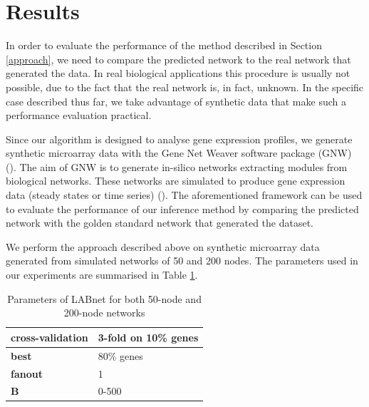\section{Results} \label{results} 
In order to evaluate the performance of the method described in Section \ref{approach}, we need to compare the predicted network to the real network that generated the data. In real biological applications this procedure is usually not possible, due to the fact that the real network is, in fact, unknown. 
In the specific case described thus far, we take advantage of synthetic data that make such a performance evaluation practical. 

Since our algorithm is designed to analyse gene expression profiles, we generate synthetic microarray data with the Gene Net Weaver software package (GNW) (\citealp{gnw1}). The aim of GNW is to generate in-silico networks extracting modules from biological networks. These networks are simulated to produce gene expression data (steady states or time series) (\citealp{gnw2}). The aforementioned framework can be used to evaluate the performance of our inference method by comparing the predicted network with the golden standard network that generated the dataset. 

We perform the approach described above on synthetic microarray data generated from simulated networks of 50 and 200 nodes. The parameters used in our experiments are summarised in Table \ref{params}.

\begin{table}[htdp] 
\begin{tabular}{| l | l |} 
\hline
\textbf{cross-validation} & 3-fold on 10\% genes \\  \hline
\textbf{best} & 80\% genes\\  \hline
\textbf{fanout} & 1 \\ 
\textbf{B} & 0-500 \\ \hline
\end{tabular}
\caption{Parameters of LABnet for both 50-node and 200-node networks}\label{params}
\end{table}  

